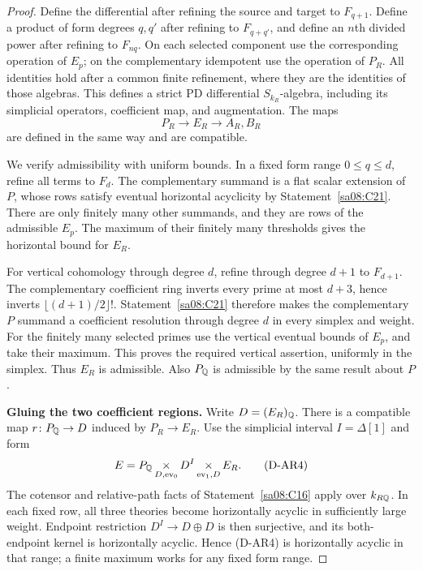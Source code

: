 \begin{proof}
Define the differential after refining the source and target
to $F_{q+1}$. Define a product of form degrees $q,q'$ after
refining to $F_{q+q'}$, and define an $n$th divided power
after refining to $F_{nq}$. On each selected component use
the corresponding operation of $E_p$; on the complementary
idempotent use the operation of $P_R$. All identities hold
after a common finite refinement, where they are the
identities of those algebras. This defines a strict PD
differential $S_{k_R}$-algebra, including its simplicial
operators, coefficient map, and augmentation. The maps
\[
 P_R\longrightarrow E_R\longrightarrow A_R,B_R
\]
are defined in the same way and are compatible.

We verify admissibility with uniform bounds. In a fixed form
range $0\leq q\leq d$, refine all terms to $F_d$.
The complementary summand is a flat scalar extension of
$P$, whose rows satisfy eventual horizontal acyclicity by
Statement~\ref{sa08:C21}. There are only finitely many
other summands, and they are rows of the admissible $E_p$.
The maximum of their finitely many thresholds gives the
horizontal bound for $E_R$.

For vertical cohomology through degree $d$, refine through
degree $d+1$ to $F_{d+1}$. The complementary coefficient
ring inverts every prime at most $d+3$, hence inverts
$\lfloor(d+1)/2\rfloor!$. Statement~\ref{sa08:C21}
therefore makes the complementary $P$ summand a coefficient
resolution through degree $d$ in every simplex and weight.
For the finitely many selected primes use the vertical
eventual bounds of $E_p$, and take their maximum. This
proves the required vertical assertion, uniformly in the
simplex. Thus $E_R$ is admissible. Also $P_\mathbb Q$ is
admissible by the same result about $P$.

\par\medskip\noindent\textbf{Gluing the two coefficient regions.}
Write $D=(E_R)_\mathbb Q$. There is a compatible map
$r\colon P_\mathbb Q\to D$ induced by $P_R\to E_R$.
Use the simplicial interval $I=\Delta[1]$ and form
\begin{equation}
 E=P_\mathbb Q\mathop{\times}_{D,\operatorname{ev}_0}D^I
       \mathop{\times}_{\operatorname{ev}_1,D}E_R.
 \tag{D-AR4}
\end{equation}
The cotensor and relative-path facts of
Statement~\ref{sa08:C16} apply over $k_{R\mathbb Q}$.
In each fixed row, all three theories become horizontally
acyclic in sufficiently large weight. Endpoint restriction
$D^I\to D\oplus D$ is then surjective, and its
both-endpoint kernel is horizontally acyclic. Hence (D-AR4)
is horizontally acyclic in that range; a finite maximum
works for any fixed form range.


\end{proof}
